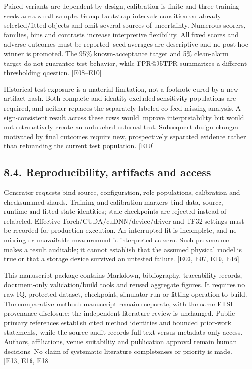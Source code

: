 \documentclass[
  10pt,
]{article}
\begin{document}
Paired variants are dependent by design, calibration is finite and three
training seeds are a small sample. Group bootstrap intervals condition
on already selected/fitted objects and omit several sources of
uncertainty. Numerous scorers, families, bins and contrasts increase
interpretive flexibility. All fixed scores and adverse outcomes must be
reported; seed averages are descriptive and no post-hoc winner is
promoted. The 95\% known-acceptance target and 5\% clean-alarm target do
not guarantee test behavior, while FPR@95TPR summarizes a different
thresholding question. {[}E08--E10{]}

Historical test exposure is a material limitation, not a footnote cured
by a new artifact hash. Both complete and identity-excluded sensitivity
populations are required, and neither replaces the separately labeled
co-feed-missing analysis. A sign-consistent result across these rows
would improve interpretability but would not retroactively create an
untouched external test. Subsequent design changes motivated by final
outcomes require new, prospectively separated evidence rather than
rebranding the current test population. {[}E10{]}

\subsection{8.4. Reproducibility, artifacts and
access}\label{reproducibility-artifacts-and-access}

Generator requests bind source, configuration, role populations,
calibration and checksummed shards. Training and calibration markers
bind data, source, runtime and fitted-state identities; stale
checkpoints are rejected instead of relabeled. Effective
Torch/CUDA/cuDNN/device/driver and TF32 settings must be recorded for
production execution. An interrupted fit is incomplete, and no missing
or unavailable measurement is interpreted as zero. Such provenance makes
a result auditable; it cannot establish that the assumed physical model
is true or that a storage device survived an untested failure. {[}E03,
E07, E10, E16{]}

This manuscript package contains Markdown, bibliography, traceability
records, document-only validation/build tools and reused aggregate
figures. It requires no raw IQ, protected dataset, checkpoint, simulator
run or fitting operation to build. The comparative-methods manuscript
remains separate, with the same ETSI provenance disclosure; the
independent literature review is unchanged. Public primary references
establish cited method identities and bounded prior-work statements,
while the source audit records full-text versus metadata-only access.
Authors, affiliations, venue suitability and publication approval remain
human decisions. No claim of systematic literature completeness or
priority is made. {[}E13, E16, E18{]}
\end{document}
